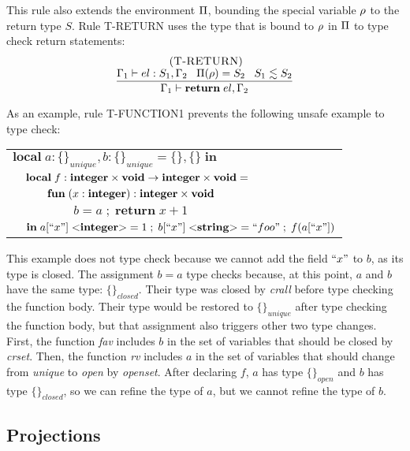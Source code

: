 This rule also extends the environment $\Pi$, bounding the special
variable $\rho$ to the return type $S$.
Rule \textsc{T-RETURN} uses the type that is bound to $\rho$ in
$\Pi$ to type check return statements:
\[
\begin{array}{c}
\; (\textsc{T-RETURN})\\
\dfrac{\Gamma_{1} \vdash el:S_{1}, \Gamma_{2} \;\;\;
       \Pi(\rho) = S_{2} \;\;\;
       S_{1} \lesssim S_{2}}
      {\Gamma_{1} \vdash \mathbf{return} \; el, \Gamma_{2}}
\end{array}
\]

As an example, rule \textsc{T-FUNCTION1} prevents the following unsafe example to type check:
\begin{center}
\begin{tabular}{llll}
\multicolumn{4}{l}{$\mathbf{local} \; a:\{\}_{unique}, b:\{\}_{unique} = \{\}, \{\} \; \mathbf{in}$}\\
& \multicolumn{3}{l}{$\mathbf{local} \; f:\mathbf{integer} \times \mathbf{void} \rightarrow \mathbf{integer} \times \mathbf{void} =$}\\
& & \multicolumn{2}{l}{$\mathbf{fun} \; (x:\mathbf{integer}):\mathbf{integer} \times \mathbf{void}$}\\
& & & \multicolumn{1}{l}{$b = a \;;\; \mathbf{return} \; x + 1$}\\
& \multicolumn{3}{l}{$\mathbf{in} \; a[``x"] \; {<}\mathbf{integer}{>} = 1 \;;\; b[``x"] \; {<}\mathbf{string}{>} = ``foo" \;;\; f(a[``x"])$}
\end{tabular}
\end{center}

This example does not type check because we cannot add the field
$``x"$ to $b$, as its type is closed.
The assignment $b = a$ type checks because, at this point,
$a$ and $b$ have the same type: $\{\}_{closed}$.
Their type was closed by \emph{crall} before type checking
the function body.
Their type would be restored to $\{\}_{unique}$ after type checking
the function body, but that assignment also triggers other two type changes.
First, the function \emph{fav} includes $b$ in the set of variables
that should be closed by \emph{crset}.
Then, the function \emph{rv} includes $a$ in the set of variables
that should change from \emph{unique} to \emph{open} by \emph{openset}.
After declaring $f$, $a$ has type $\{\}_{open}$ and $b$ has type $\{\}_{closed}$,
so we can refine the type of $a$, but we cannot refine the type of $b$.

\subsection{Projections}
\label{sec:fap}

